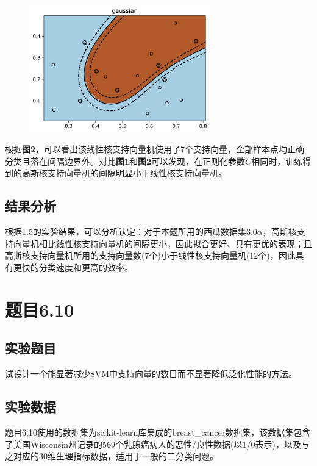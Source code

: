\documentclass[12pt]{article}
\begin{document}
\begin{figure}[h]
	\centering
	\includegraphics[width=0.7\textwidth]{gaussian_result.jpg}
\end{figure}
\par 
根据\textbf{图2}，可以看出该线性核支持向量机使用了7个支持向量，全部样本点均正确分类且落在间隔边界外。对比\textbf{图1}和\textbf{图2}可以发现，在正则化参数$C$相同时，训练得到的高斯核支持向量机的间隔明显小于线性核支持向量机。
\par

\vbox{}

\subsection{结果分析}
根据1.5的实验结果，可以分析认定：对于本题所用的西瓜数据集$3.0\alpha$，高斯核支持向量机相比线性核支持向量机的间隔更小，因此拟合更好、具有更优的表现；且高斯核支持向量机所用的支持向量数(7个)小于线性核支持向量机(12个)，因此具有更快的分类速度和更高的效率。
\vbox{}

\newpage
\section{题目6.10}
\subsection{实验题目}
试设计一个能显著减少SVM中支持向量的数目而不显著降低泛化性能的方法。
\vbox{}
\subsection{实验数据}
题目6.10使用的数据集为scikit-learn库集成的breast\_cancer数据集，该数据集包含了美国Wisconsin州记录的569个乳腺癌病人的恶性/良性数据(以1/0表示)，以及与之对应的30维生理指标数据，适用于一般的二分类问题。
\end{document}
